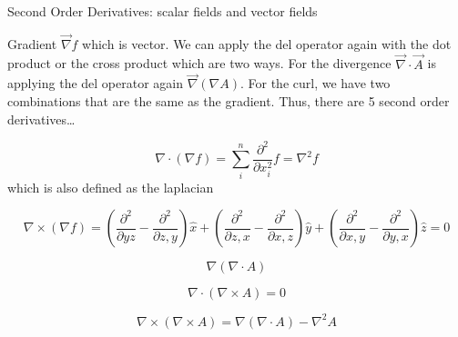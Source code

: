 \begin{remark}
    Second Order Derivatives: scalar fields and vector fields

    Gradient \( \vec{\nabla } f\) which is vector. We can apply the del operator again with the dot product
    or the cross product which are two ways. For the divergence \(\vec{\nabla  } \cdot \vec{A}\) is 
    applying the del operator again \(\vec{\nabla } (\nabla A)\). For the curl, we have two combinations that are the same
    as the gradient. Thus, there are 5 second order derivatives\dots

    \begin{definition}
        \[
            \nabla  \cdot (\nabla f) = \sum_{i}^n \frac{\partial ^{2} }{\partial x_i ^{2}   } f = \nabla ^{2} f
        \]
        which is also defined as the laplacian
    \end{definition}

    \begin{definition}
        \[
            \nabla \times (\nabla  f) = (\frac{\partial ^{2} }{\partial y z} - \frac{\partial ^{2} }{\partial z,y} ) \hat{x}
            + (\frac{\partial ^{2} }{\partial z, x} - \frac{\partial ^{2} }{\partial x, z} ) \hat{y}
            + (\frac{\partial ^{2} }{\partial x,y} - \frac{\partial ^{2} }{\partial y,x} ) \hat{z} = 0
        \]
    \end{definition}
    \begin{definition}
        \[
            \nabla (\nabla  \cdot A) 
        \]
    \end{definition}
    \begin{definition}
        \[
            \nabla  \cdot (\nabla \times A ) = 0
        \]
    \end{definition}
    \begin{definition}
        \[
            \nabla \times (\nabla \times A) = \nabla (\nabla  \cdot A) - \nabla ^{2} A
        \]
    \end{definition}
\end{remark}

